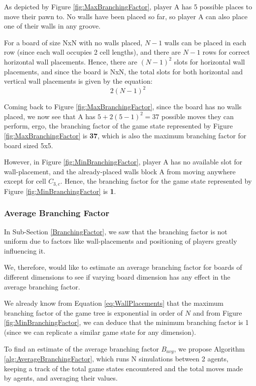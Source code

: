 As depicted by Figure \ref{fig:MaxBranchingFactor}, player A has 5 possible places to move their pawn to. No walls have been placed so far, so player A can also place one of their walls in any groove.

For a board of size NxN with no walls placed, $N-1$ walls can be placed in each row (since each wall occupies 2 cell lengths), and there are $N-1$ rows for correct horizontal wall placements. Hence, there are $(N-1)^2$ slots for horizontal wall placements, and since the board is NxN, the total  slots for both horizontal and vertical wall placements is given by the equation:
\begin{equation}
\label{eq:WallPlacements}
    2(N-1)^2
\end{equation}

Coming back to Figure \ref{fig:MaxBranchingFactor}, since the board has no walls placed, we now see that A has $5 + 2(5-1)^2 = 37$ possible moves they can perform, ergo, the branching factor of the game state represented by Figure \ref{fig:MaxBranchingFactor} is \textbf{37}, which is also the maximum branching factor for board sized 5x5.

However, in Figure \ref{fig:MinBranchingFactor}, player A has no available slot for wall-placement, and the already-placed walls block A from moving anywhere except for cell \textbf{$C_{3, c}$}. Hence, the branching factor for the game state represented by Figure \ref{fig:MinBranchingFactor} is \textbf{1}.

\subsubsection{Average Branching Factor}

In Sub-Section \ref{BranchingFactor}, we saw that the branching factor is not uniform due to factors like wall-placements and positioning of players greatly influencing it.

We, therefore, would like to estimate an average branching factor for boards of different dimensions to see if varying board dimension has any effect in the average branching factor.

We already know from Equation \ref{eq:WallPlacements} that the maximum branching factor of the game tree is exponential in order of $N$ and from Figure \ref{fig:MinBranchingFactor}, we can deduce that the minimum branching factor is 1 (since we can replicate a similar game state for any dimension).

To find an estimate of the average branching factor $B_{avg}$, we propose Algorithm \ref{alg:AverageBranchingFactor}, which runs N simulations between 2 agents, keeping a track of the total game states encountered and the total moves made by agents, and averaging their values.

